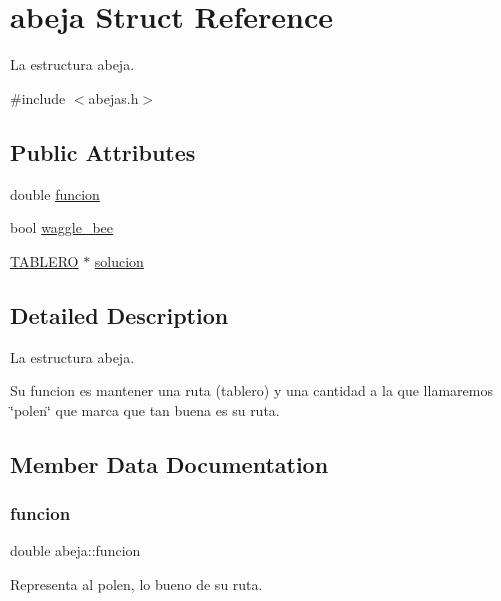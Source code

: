 \hypertarget{structabeja}{}\section{abeja Struct Reference}
\label{structabeja}


La estructura abeja.  




{\ttfamily \#include $<$abejas.\+h$>$}

\subsection*{Public Attributes}
\begin{DoxyCompactItemize}
\item 
double \hyperlink{structabeja_a0a971f0f61da329d71f4d5d8e6a8157d}{funcion}
\item 
bool \hyperlink{structabeja_a5811ab09f25d7a2c258573d6ed2104ca}{waggle\+\_\+bee}
\item 
\hyperlink{tablero_8h_acbb1e9c862ccf810af77512ddb019a82}{T\+A\+B\+L\+E\+RO} $\ast$ \hyperlink{structabeja_a66f19430fe511ed584b2ff01dcc0d332}{solucion}
\end{DoxyCompactItemize}


\subsection{Detailed Description}
La estructura abeja. 

Su funcion es mantener una ruta (tablero) y una cantidad a la que llamaremos \char`\"{}polen\char`\"{} que marca que tan buena es su ruta. 

\subsection{Member Data Documentation}
\mbox{\label{structabeja_a0a971f0f61da329d71f4d5d8e6a8157d}} 
\subsubsection{\texorpdfstring{funcion}{funcion}}
{\footnotesize\ttfamily double abeja\+::funcion}

Representa al polen, lo bueno de su ruta. \mbox{\label{structabeja_a66f19430fe511ed584b2ff01dcc0d332}} 
